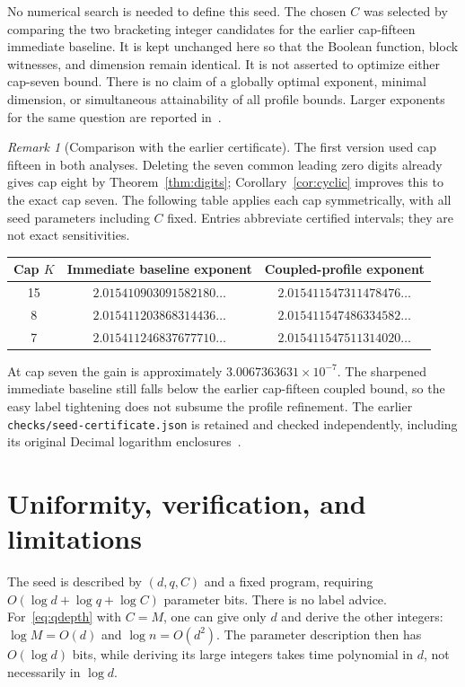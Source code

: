 \documentclass[11pt]{amsart}
\theoremstyle{definition}
\theoremstyle{remark}
\newtheorem{remark}[theorem]{Remark}
\begin{document}
No numerical search is needed to define this seed. The chosen $C$ was
selected by comparing the two bracketing integer candidates for the
earlier cap-fifteen immediate baseline. It is kept unchanged here so that
the Boolean function, block witnesses, and dimension remain identical.
It is not asserted to optimize either cap-seven bound. There is no claim
of a globally optimal exponent, minimal dimension, or simultaneous
attainability of all profile bounds. Larger exponents for the same
question are reported in~\cite{ProveItI,ProveItII}.

\begin{remark}[Comparison with the earlier certificate]
The first version used cap fifteen in both analyses. Deleting the seven
common leading zero digits already gives cap eight by
Theorem~\ref{thm:digits}; Corollary~\ref{cor:cyclic} improves this to the
exact cap seven. The following table applies each cap symmetrically, with
all seed parameters including $C$ fixed. Entries abbreviate certified
intervals; they are not exact sensitivities.
\begin{center}
\small
\begin{tabular}{@{}ccc@{}}
\toprule
Cap $K$ & Immediate baseline exponent & Coupled-profile exponent\\
\midrule
15 & $2.015410903091582180\ldots$ & $2.015411547311478476\ldots$\\
8 & $2.015411203868314436\ldots$ & $2.015411547486334582\ldots$\\
7 & $2.015411246837677710\ldots$ & $2.015411547511314020\ldots$\\
\bottomrule
\end{tabular}
\end{center}
At cap seven the gain is approximately $3.0067363631\times10^{-7}$.
The sharpened immediate baseline still falls below the earlier cap-fifteen
coupled bound, so the easy label tightening does not subsume the profile
refinement. The earlier \nolinkurl{checks/seed-certificate.json} is retained
and checked independently, including its original Decimal logarithm
enclosures~\cite{Decimal}.
\end{remark}

\section{Uniformity, verification, and limitations}
The seed is described by $(d,q,C)$ and a fixed program, requiring
$O(\log d+\log q+\log C)$ parameter bits. There is no label advice.
For~\eqref{eq:qdepth} with $C=M$, one can give only $d$ and derive the
other integers: $\log M=O(d)$ and $\log n=O(d^2)$. The parameter
description then has $O(\log d)$ bits, while deriving its large integers
takes time polynomial in $d$, not necessarily in $\log d$.
\end{document}
